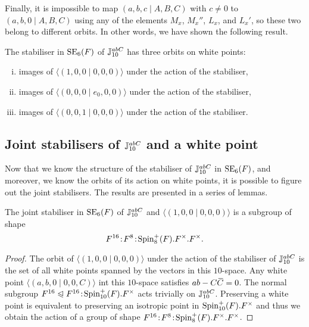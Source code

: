 Finally, it is impossible to map $(a,b,c\mid A,B,C)$ with $c \neq 0$ to $(a,b,0\mid A,B,C)$ using any of the
elements $M_x$, $M_x''$, $L_x$, and $L_x'$, so these two belong to different orbits. In other words, we have shown the following 
result.

\begin{theorem}
	\label{theorem:1_white_space_stab_orbits}
	The stabiliser in $\mathrm{SE}_6(F)$ of\phantom{;} $\mathbb{J}_{10}^{abC}$ has three orbits on white points:
	\begin{enumerate}[(i)]
		\item images of $\langle (1,0,0 \mid 0,0,0) \rangle $ under the action of the stabiliser,
		\item images of $\langle (0,0,0\mid e_0,0,0) \rangle$ under the action of the stabiliser,
		\item images of $\langle (0,0,1 \mid 0,0,0) \rangle$ under the action of the stabiliser.
	\end{enumerate}
\end{theorem}

\subsection{Joint stabilisers of $\mathbb{J}_{10}^{abC}$ and a white point}

Now that we know the structure of the stabiliser of $\mathbb{J}_{10}^{abC}$ in $\mathrm{SE}_6(F)$, and moreover, we know the orbits of 
its action on white points, it is possible to figure out the joint stabilisers. The results are presented in a series of lemmas.

\begin{lemma}
	\label{lemma:1_stab_joint_1}
	The joint stabiliser in $\mathrm{SE}_6(F)$ of\phantom{;} $\mathbb{J}_{10}^{abC}$ and $\langle (1,0,0 \mid 0,0,0) \rangle$ is a subgroup
	of shape 
	\begin{equation}
		F^{16}\mathord{{\;\!{:}\;\!}} F^8\mathord{{\;\!{:}\;\!}}\mathrm{Spin}_8^+(F).F^{\times}.F^{\times}.
	\end{equation}
\end{lemma}

\begin{proof}
	The orbit of $\langle (1,0,0 \mid 0,0,0) \rangle$ under the action of the stabiliser of $\mathbb{J}_{10}^{abC}$ is the set of all white points
	spanned by the vectors in this $10$-space. Any white point $\langle (a,b,0 \mid 0,0,C) \rangle$ int this $10$-space satisfies $ab - C\mathord{\mbox{\hspace*{0pt}}\,\overline{\!C\!\!\;}\!\:}\mbox{\hspace*{0pt}} = 0$. The
	normal subgroup 
\mbox{$F^{16} \trianglelefteqslant F^{16}\mathord{{\;\!{:}\;\!}}\mathrm{Spin}_{10}^+(F).F^{\times}$} acts trivially on $\mathbb{J}_{10}^{abC}$. Preserving a white point
	is equivalent to preserving an isotropic point in $\mathrm{Spin}_{10}^+(F).F^{\times}$ and thus we obtain the action of a group of shape $F^{16}\mathord{{\;\!{:}\;\!}} F^8\mathord{{\;\!{:}\;\!}}\mathrm{Spin}_8^+(F).F^{\times}.F^{\times}$.
\end{proof}

